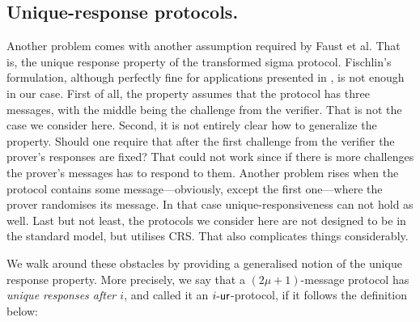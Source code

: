 \let\accentvec\vec \documentclass[runningheads]{llncs}
\begin{document}
\subsection{Unique-response protocols.}
Another problem comes with another assumption required by Faust et al. That is, the unique response property of the transformed sigma protocol.
Fischlin's formulation, although perfectly fine for applications presented in
\cite{C:Fischlin05,INDOCRYPT:FKMV12}, is not enough in our case.  First of all, the property
assumes that the protocol has three messages, with
the middle being the challenge from the verifier. That is not the case we
consider here. Second, it is not entirely clear how to generalize the
property. Should one require that after the first challenge from the verifier
the prover's responses are fixed? That could not work since if there is more
challenges the prover's messages has to respond to them.  Another problem rises when the protocol
contains some message---obviously, except the first one---where the prover
randomises its message. In that case unique-responsiveness can not hold as
well.  Last but not least, the protocols we consider here are not designed to
be in the standard model, but utilises CRS. That also complicates things
considerably.

We walk around these obstacles by providing a generalised notion of the unique
response property.  More precisely, we say that a $(2\mu + 1)$-message protocol
has \emph{unique responses after $i$}, and called it an ${i\text{-}\mathsf{ur}}$-protocol, if it
follows the definition below:
\end{document}
